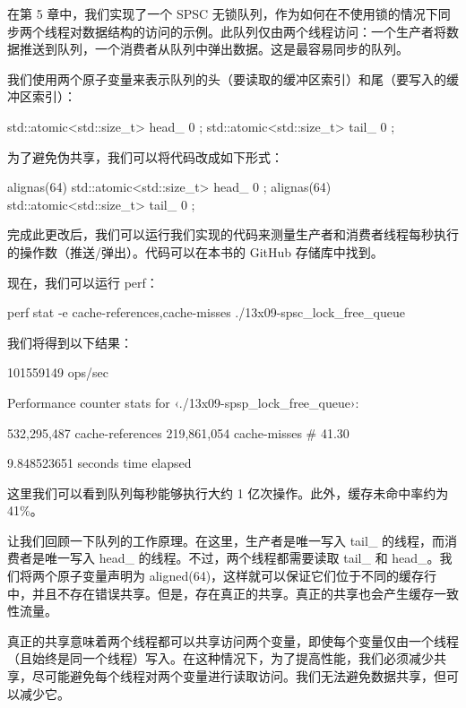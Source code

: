 在第 5 章中，我们实现了一个 SPSC 无锁队列，作为如何在不使用锁的情况下同步两个线程对数据结构的访问的示例。此队列仅由两个线程访问：一个生产者将数据推送到队列，一个消费者从队列中弹出数据。这是最容易同步的队列。

我们使用两个原子变量来表示队列的头（要读取的缓冲区索引）和尾（要写入的缓冲区索引）：

\begin{cpp}
std::atomic<std::size_t> head_ { 0 };
std::atomic<std::size_t> tail_ { 0 };
\end{cpp}

为了避免伪共享，我们可以将代码改成如下形式：

\begin{cpp}
alignas(64) std::atomic<std::size_t> head_ { 0 };
alignas(64) std::atomic<std::size_t> tail_ { 0 };
\end{cpp}

完成此更改后，我们可以运行我们实现的代码来测量生产者和消费者线程每秒执行的操作数（推送/弹出）。代码可以在本书的 GitHub 存储库中找到。

现在，我们可以运行 perf：

\begin{shell}
perf stat -e cache-references,cache-misses ./13x09-spsc_lock_free_queue
\end{shell}

我们将得到以下结果：

\begin{shell}
101559149 ops/sec

    Performance counter stats for ‹./13x09-spsp_lock_free_queue›:

        532,295,487      cache-references
        219,861,054      cache-misses # 41.30%

        9.848523651 seconds time elapsed
\end{shell}

这里我们可以看到队列每秒能够执行大约 1 亿次操作。此外，缓存未命中率约为 41\%。

让我们回顾一下队列的工作原理。在这里，生产者是唯一写入 tail\_ 的线程，而消费者是唯一写入 head\_ 的线程。不过，两个线程都需要读取 tail\_ 和 head\_。我们将两个原子变量声明为 aligned(64)，这样就可以保证它们位于不同的缓存行中，并且不存在错误共享。但是，存在真正的共享。真正的共享也会产生缓存一致性流量。

真正的共享意味着两个线程都可以共享访问两个变量，即使每个变量仅由一个线程（且始终是同一个线程）写入。在这种情况下，为了提高性能，我们必须减少共享，尽可能避免每个线程对两个变量进行读取访问。我们无法避免数据共享，但可以减少它。

